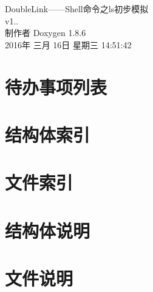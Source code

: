 \documentclass[twoside]{book}
\newcommand{\clearemptydoublepage}{%
  \newpage{\pagestyle{empty}\cleardoublepage}%
}
\begin{document}
\hypersetup{pageanchor=false}
\begin{titlepage}
\vspace*{7cm}
\begin{center}%
{\Large Double\-Link——\-Shell命令之ls初步模拟 \\[1ex]\large v1.. }\\
\vspace*{1cm}
{\large 制作者 Doxygen 1.8.6}\\
\vspace*{0.5cm}
{\small 2016年 三月 16日 星期三 14:51:42}\\
\end{center}
\end{titlepage}
\clearemptydoublepage
\tableofcontents
\clearemptydoublepage
{}
\hypersetup{pageanchor=true}

\chapter{待办事项列表}
\label{todo}
\hypertarget{todo}{}

\chapter{结构体索引}

\chapter{文件索引}

\chapter{结构体说明}



\chapter{文件说明}




\newpage
{}
{}
\printindex
\end{document}
